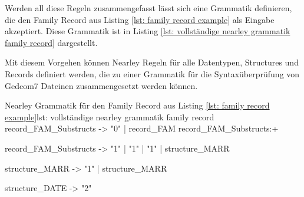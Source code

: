 \vspace{1em}
Werden all diese Regeln zusammengefasst lässt sich eine Grammatik definieren, die den Family Record aus Listing \ref{lst: family record example} als Eingabe akzeptiert. Diese Grammatik ist in Listing \ref{lst: vollständige nearley grammatik family record} dargestellt.

Mit diesem Vorgehen können Nearley Regeln für alle Datentypen, Structures und Records definiert werden, die zu einer Grammatik für die Syntaxüberprüfung von Gedcom7 Dateinen zusammengesetzt werden können.
\vspace{1em}
\begin{javascript}{Nearley Grammatik für den Family Record aus Listing \ref{lst: family record example}}{lst: vollständige nearley grammatik family record}
	record_FAM_Substructs
		-> "0"  %
		|  record_FAM  record_FAM_Substructs:+
		
	record_FAM_Substructs 
		-> "1"  %
		|  "1"  %
		|  "1"  %
		|  structure_MARR 
		
	structure_MARR
		-> "1"  %
		|  structure_MARR  
		
	structure_DATE
		-> "2" %
\end{javascript}
\vspace{1em}

